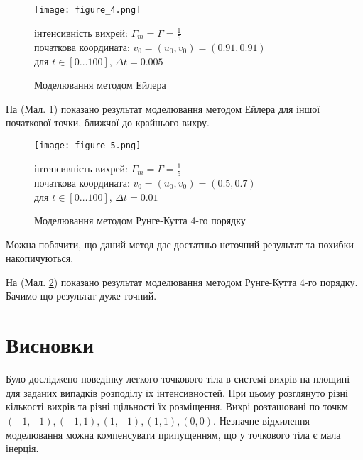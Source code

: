 \documentclass[a4paper,12pt]{article}
\begin{document}
\begin{figure}[!ht]
	\centering
   	\texttt{[image: figure\_4.png]}
	\caption{Моделювання методом Ейлера}
	\label{fig:2}
	інтенсивність вихрей: $\Gamma_m = \Gamma = \frac{1}{5}$ \\
	початкова координата: $v_0 = (u_0, v_0) = (0.91, 0.91)$ \\
	для $t \in [0 \dots 100]$, $\Delta t = 0.005$
\end{figure}	

На (Мал. \ref{fig:2}) показано результат моделювання методом Ейлера для іншої початкової точки, ближчої до крайнього вихру.


\newpage
\begin{figure}[!ht]
	\centering
   	\texttt{[image: figure\_5.png]}
	\caption{Моделювання методом Рунге-Кутта 4-го порядку}
	\label{fig:3}
	інтенсивність вихрей: $\Gamma_m = \Gamma = \frac{1}{5}$ \\
	початкова координата: $v_0 = (u_0, v_0) = (0.5, 0.7)$ \\
	для $t \in [0 \dots 100]$, $\Delta t = 0.01$
\end{figure}	

Можна побачити, що даний метод дає достатньо неточний результат та похибки накопичуються.

На (Мал. \ref{fig:3}) показано результат моделювання методом Рунге-Кутта 4-го порядку. Бачимо що результат дуже точний.


\newpage
\section{Висновки}

Було досліджено поведінку легкого точкового тіла в системі вихрів на площині для заданих випадків розподілу їх інтенсивностей. При цьому розглянуто різні кількості вихрів та різні щільності їх розміщення. Вихрі розташовані по точкм $(-1, -1), (-1, 1), (1, -1), (1, 1), (0, 0)$. Незначне відхилення моделювання можна компенсувати припущенням, що у точкового тіла є мала інерція. 
\end{document}

